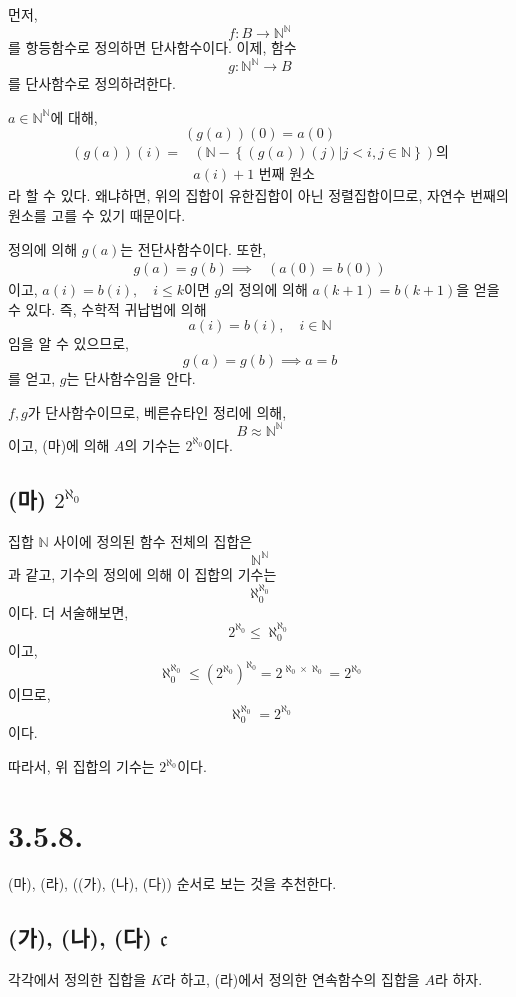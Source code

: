 \documentclass{article}
\begin{document}
먼저, $$f : B \rightarrow \mathbb{N}^{\mathbb{N}}$$를 항등함수로 정의하면 단사함수이다.
이제, 함수
$$g : \mathbb{N}^{\mathbb{N}} \rightarrow B$$를 단사함수로 정의하려한다.

$a \in \mathbb{N}^{\mathbb{N}}$에 대해,
$$(g(a))(0) = a(0)$$
\begin{align*}
(g(a))(i) =& \left( \mathbb{N} - \left\{(g(a))(j) \bigg| j < i, j \in \mathbb{N}  \right\} \right) \text{의}
\\ &\text{$a(i)+1$ 번째 원소} \tag{$1 \le i$}
\end{align*}
라 할 수 있다. 왜냐하면, 위의 집합이 유한집합이 아닌 정렬집합이므로, 자연수 번째의 원소를 고를 수 있기 때문이다.

정의에 의해 $g(a)$는 전단사함수이다. 또한,
\begin{align*}
g(a) = g(b) \implies& (a(0) = b(0)) 
\end{align*}이고, $a(i) = b(i), \quad i \le k$이면 $g$의 정의에 의해
$a(k+1) = b(k+1)$을 얻을 수 있다. 즉, 수학적 귀납법에 의해 
$$a(i) = b(i), \quad i \in \mathbb{N}$$임을 알 수 있으므로,
$$g(a) = g(b) \implies a = b$$를 얻고, $g$는 단사함수임을 안다.

$f, g$가 단사함수이므로, 베른슈타인 정리에 의해,
$$ B \approx  \mathbb{N}^{\mathbb{N}}$$
이고, (마)에 의해 $A$의 기수는 $2^{\aleph_0}$이다.


\subsection{(마) $2^{\aleph_0}$}
집합 $\mathbb{N}$ 사이에 정의된 함수 전체의 집합은
$$\mathbb{N}^\mathbb{N}$$과 같고, 기수의 정의에 의해 이 집합의 기수는
$$\aleph_0 ^ {\aleph_0}$$이다. 더 서술해보면,
$$2 ^ {\aleph_0} \le \aleph_0 ^ {\aleph_0} $$이고,
$$\aleph_0 ^ {\aleph_0} \le (2^{\aleph_0}) ^ {\aleph_0} = 2^{{\aleph_0} \times {\aleph_0}} = 2^{\aleph_0}$$
이므로,
$$\aleph_0 ^ {\aleph_0} = 2^{\aleph_0}$$이다.

따라서, 위 집합의 기수는 $2^{\aleph_0}$이다.

\section{3.5.8.}
(마), (라), ((가), (나), (다)) 순서로 보는 것을 추천한다.

\subsection{(가), (나), (다) $\mathfrak{c}$}
각각에서 정의한 집합을 $K$라 하고, (라)에서 정의한 연속함수의 집합을 $A$라 하자.
\end{document}
